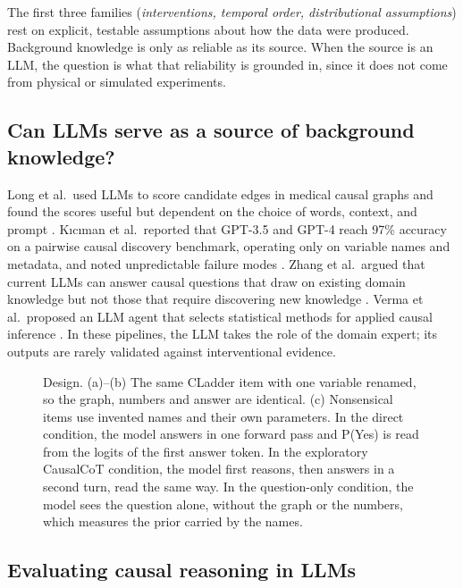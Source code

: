 \documentclass{llncs}
\begin{document}
The first three families (\emph{interventions, temporal order, distributional assumptions}) rest on explicit, testable assumptions about how the data were produced. Background knowledge is only as reliable as its source. When the source is an LLM, the question is what that reliability is grounded in, since it does not come from physical or simulated experiments.

\subsection{Can LLMs serve as a source of background knowledge?}
\label{sec:llm-bk}

Long et al.\ used LLMs to score candidate edges in medical causal graphs and found the scores useful but dependent on the choice of words, context, and prompt \cite{long2023can}. Kıcıman et al.\ reported that GPT-3.5 and GPT-4 reach 97\% accuracy on a pairwise causal discovery benchmark, operating only on variable names and metadata, and noted unpredictable failure modes \cite{kiciman2023causal}. Zhang et al.\ argued that current LLMs can answer causal questions that draw on existing domain knowledge but not those that require discovering new knowledge \cite{zhang2023understanding}. Verma et al.\ proposed an LLM agent that selects statistical methods for applied causal inference \cite{verma2025causal}. In these pipelines, the LLM takes the role of the domain expert; its outputs are rarely validated against interventional evidence.

\begin{figure}[t]
  \centering
  
  \caption{Design. (a)--(b) The same CLadder item with one variable renamed,
  so the graph, numbers and answer are identical. (c) Nonsensical items use
  invented names and their own parameters. In the direct condition, the model
  answers in one forward pass and P(Yes) is read from the logits of the first
  answer token. In the exploratory CausalCoT condition, the model first
  reasons, then answers in a second turn, read the same way. In the
  question-only condition, the model sees the question alone, without the
  graph or the numbers, which measures the prior carried by the names.}
  \label{fig:design}
\end{figure}

\subsection{Evaluating causal reasoning in LLMs}
\label{sec:eval}
\end{document}
